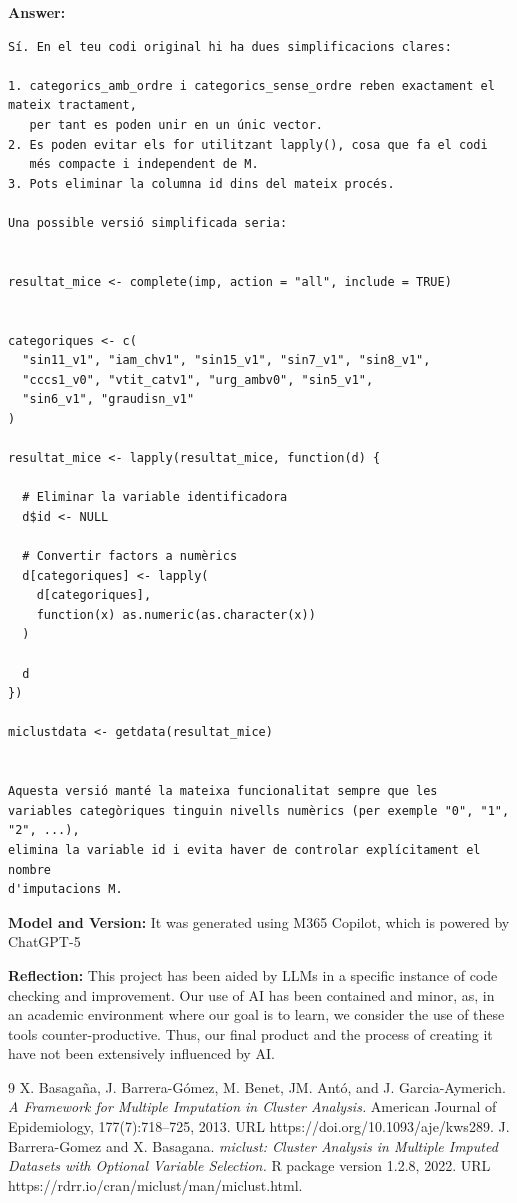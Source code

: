 \documentclass[a4paper,10pt]{article}\usepackage[]{graphicx}\usepackage[]{xcolor}
\begin{document}
\textbf{Answer:}

\begin{verbatim}
Sí. En el teu codi original hi ha dues simplificacions clares:

1. categorics_amb_ordre i categorics_sense_ordre reben exactament el mateix tractament,
   per tant es poden unir en un únic vector.
2. Es poden evitar els for utilitzant lapply(), cosa que fa el codi
   més compacte i independent de M.
3. Pots eliminar la columna id dins del mateix procés.

Una possible versió simplificada seria:


resultat_mice <- complete(imp, action = "all", include = TRUE)


categoriques <- c(
  "sin11_v1", "iam_chv1", "sin15_v1", "sin7_v1", "sin8_v1",
  "cccs1_v0", "vtit_catv1", "urg_ambv0", "sin5_v1",
  "sin6_v1", "graudisn_v1"
)

resultat_mice <- lapply(resultat_mice, function(d) {

  # Eliminar la variable identificadora
  d$id <- NULL

  # Convertir factors a numèrics
  d[categoriques] <- lapply(
    d[categoriques],
    function(x) as.numeric(as.character(x))
  )

  d
})

miclustdata <- getdata(resultat_mice)


Aquesta versió manté la mateixa funcionalitat sempre que les
variables categòriques tinguin nivells numèrics (per exemple "0", "1", "2", ...),
elimina la variable id i evita haver de controlar explícitament el nombre
d'imputacions M.
\end{verbatim}


\textbf{Model and Version:} It was generated using M365 Copilot, which is powered by ChatGPT-5

\textbf{Reflection:} This project has been aided by LLMs in a specific instance 
of code checking and improvement. Our use of AI has been contained and minor,
as, in an academic environment where our goal is to learn, we consider the use of
these tools counter-productive. Thus, our final product and the process of creating
it have not been extensively influenced by AI.

\begin{thebibliography}{9}
    X. Basagaña, J. Barrera-Gómez, M. Benet, JM. Antó, and J. Garcia-Aymerich.
    \emph{A Framework for Multiple Imputation in Cluster Analysis.}
    American Journal of Epidemiology, 177(7):718–725, 2013.
    URL https://doi.org/10.1093/aje/kws289.
    J. Barrera-Gomez and X. Basagana.
    \emph{miclust: Cluster Analysis in Multiple Imputed Datasets with Optional Variable Selection.}
    R package version 1.2.8, 2022.
    URL https://rdrr.io/cran/miclust/man/miclust.html.
\end{thebibliography}
\end{document}
